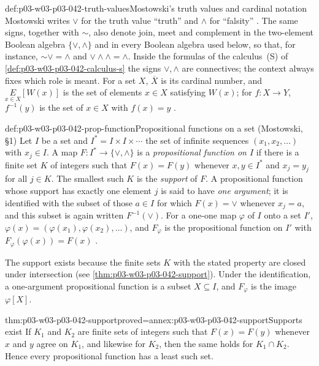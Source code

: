 \begin{hbconvention}{def:p03-w03-p03-042-truth-values}{Mostowski's truth values and cardinal notation}
Mostowski writes \(\vee\) for the truth value ``truth'' and \(\wedge\) for
``falsity'' \cite[p.~12]{Mostowski1957}.  The same signs, together with
\(\sim\), also denote join, meet and complement in the two-element Boolean
algebra \(\{\vee,\wedge\}\) and in every Boolean algebra used below, so that,
for instance, \({\sim}\vee=\wedge\) and \(\vee\wedge\wedge=\wedge\).  Inside
the formulas of the calculus~(S) of
\cref{def:p03-w03-p03-042-calculus-s} the signs \(\vee,\wedge\) are
connectives; the context always fixes which role is meant.  For a set
\(X\), \(\overline{X}\) is its cardinal number, and
\(\underset{x\in X}{E}[W(x)]\) is the set of elements \(x\in X\)
satisfying \(W(x)\); for \(f:X\to Y\), \(f^{-1}(y)\) is the set of
\(x\in X\) with \(f(x)=y\) \cite[p.~13, note~4]{Mostowski1957}.
\end{hbconvention}

\begin{hbdefinition}{def:p03-w03-p03-042-prop-function}{Propositional functions on a set (Mostowski, \S1)}
Let \(I\) be a set and \(I^{*}=I\times I\times\cdots\) the set of infinite
sequences \((x_1,x_2,\ldots)\) with \(x_j\in I\).  A map
\(F:I^{*}\to\{\vee,\wedge\}\) is a \emph{propositional function on \(I\)}
if there is a finite set \(K\) of integers such that \(F(x)=F(y)\)
whenever \(x,y\in I^{*}\) and \(x_j=y_j\) for all \(j\in K\).  The smallest
such \(K\) is the \emph{support} of \(F\).  A propositional function whose
support has exactly one element \(j\) is said to have \emph{one
argument}; it is identified with the subset of those \(a\in I\) for which
\(F(x)=\vee\) whenever \(x_j=a\), and this subset is again written
\(F^{-1}(\vee)\).  For a one-one map \(\varphi\) of \(I\) onto a set
\(I'\), \(\varphi(x)=(\varphi(x_1),\varphi(x_2),\ldots)\), and \(F_\varphi\)
is the propositional function on \(I'\) with
\(F_\varphi(\varphi(x))=F(x)\) \cite[pp.~12--13]{Mostowski1957}.
\end{hbdefinition}

The support exists because the finite sets \(K\) with the stated property
are closed under intersection (see \cref{thm:p03-w03-p03-042-support}).
Under the identification, a one-argument propositional function is a
subset \(X\subseteq I\), and \(F_\varphi\) is the image \(\varphi[X]\).

\begin{hblemma}{thm:p03-w03-p03-042-support}{proved=annex:p03-w03-p03-042-support}{Supports exist}
If \(K_1\) and \(K_2\) are finite sets of integers such that \(F(x)=F(y)\)
whenever \(x\) and \(y\) agree on \(K_1\), and likewise for \(K_2\), then
the same holds for \(K_1\cap K_2\).  Hence every propositional function
has a least such set.
\end{hblemma}

